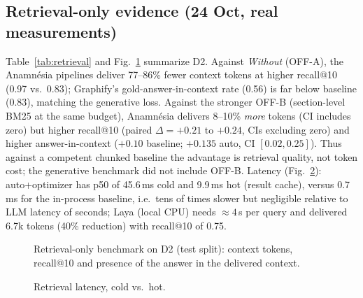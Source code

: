 \documentclass[conference,onecolumn,11pt]{IEEEtran}
\newcommand{\anam}{Anam\-n\'esia}
\begin{document}
\subsection{Retrieval-only evidence (24 Oct, real measurements)}
Table~\ref{tab:retrieval} and Fig.~\ref{fig:retr} summarize D2. Against \emph{Without} (OFF-A), the \anam{} pipelines deliver 77--86\% fewer context tokens at higher recall@10 (0.97 vs.\ 0.83); Graphify's gold-answer-in-context rate (0.56) is far below baseline (0.83), matching the generative loss. Against the stronger OFF-B (section-level BM25 at the same budget), \anam{} delivers 8--10\% \emph{more} tokens (CI includes zero) but higher recall@10 (paired $\Delta{=}+0.21$ to $+0.24$, CIs excluding zero) and higher answer-in-context ($+0.10$ baseline; $+0.135$ auto, CI $[0.02,0.25]$). Thus against a competent chunked baseline the advantage is retrieval quality, not token cost; the generative benchmark did not include OFF-B. Latency (Fig.~\ref{fig:lat}): auto+optimizer has p50 of 45.6\,ms cold and 9.9\,ms hot (result cache), versus 0.7\,ms for the in-process baseline, i.e.\ tens of times slower but negligible relative to LLM latency of seconds; Laya (local CPU) needs $\approx4$\,s per query and delivered 6.7k tokens (40\% reduction) with recall@10 of 0.75.



\begin{figure}[!htbp]\centering
{}
\caption{Retrieval-only benchmark on D2 (test split): context tokens, recall@10 and presence of the answer in the delivered context.}\label{fig:retr}
\end{figure}

\begin{figure}[!htbp]\centering
{}
\caption{Retrieval latency, cold vs.\ hot.}\label{fig:lat}
\end{figure}
\end{document}
